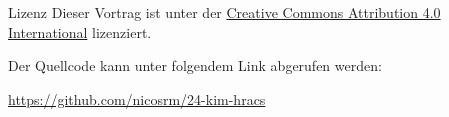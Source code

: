 
\begin{frame}{Lizenz}
    Dieser Vortrag ist unter der \href{https://creativecommons.org/licenses/by/4.0/}{Creative Commons Attribution 4.0 International} lizenziert. \ccby

    Der Quellcode kann unter folgendem Link abgerufen werden:

    \url{https://github.com/nicosrm/24-kim-hracs}
\end{frame}
